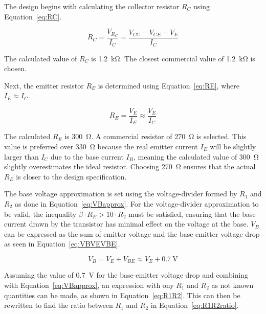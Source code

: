 \documentclass{article}
\begin{document}
The design begins with calculating the collector resistor \(R_C\) using Equation~\ref{eq:RC}.



\begin{equation}
    \label{eq:RC}
    R_C = \frac{V_{R_C}}{I_C} = \frac{V_{CC} - V_{CE} - V_E}{I_C}
\end{equation}

The calculated value of \(R_C\) is \SI{1.2}{\kilo\ohm}.  
The closest commercial value of \SI{1.2}{\kilo\ohm} is chosen.  

Next, the emitter resistor \(R_E\) is determined using Equation~\ref{eq:RE}, where \(I_E \approx I_C\).

\begin{equation}
    \label{eq:RE}
    R_E = \frac{V_E}{I_E} \approx \frac{V_E}{I_C}
\end{equation}

The calculated \(R_E\) is \SI{300}{\ohm}.  
A commercial resistor of \SI{270}{\ohm} is selected.  
This value is preferred over \SI{330}{\ohm} because the real emitter current \(I_E\) will be slightly larger than \(I_C\) due to the base current \(I_B\), meaning the calculated value of \SI{300}{\ohm} slightly overestimates the ideal resistor.  
Choosing \SI{270}{\ohm} ensures that the actual \(R_E\) is closer to the design specification.  

The base voltage approximation is set using the voltage-divider formed by \(R_1\) and \(R_2\) as done in Equation~\ref{eq:VBapprox}.
For the voltage-divider approximation to be valid, the inequality \(\beta \cdot R_E > 10 \cdot R_2\) must be satisfied, ensuring that the base current drawn by the transistor has minimal effect on the voltage at the base.  
\(V_B\) can be expressed as the sum of emitter voltage and the base-emitter voltage drop as seen in Equation~\ref{eq:VBVEVBE}.

\begin{equation}
    \label{eq:VBVEVBE}
    V_B = V_E + V_{BE} \approx V_E + \SI{0.7}{\volt}
\end{equation}

Assuming the value of \SI{0.7}{\volt} for the base-emitter voltage drop and combining with Equation~\ref{eq:VBapprox}, an expression with ony \(R_1\) and \(R_2\) as not known quantities can be made, as shown in Equation~\ref{eq:R1R2}.
This can then be rewritten to find the ratio between \(R_1\) and \(R_2\) in Equation~\ref{eq:R1R2ratio}.
\end{document}
